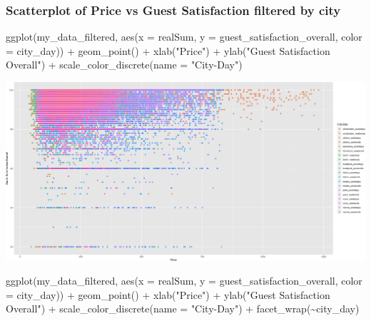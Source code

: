 \documentclass[
]{article}
\newenvironment{Shaded}{\begin{snugshade}}{\end{snugshade}}
\newcommand{\AttributeTok}[1]{\textcolor[rgb]{0.77,0.63,0.00}{#1}}
\newcommand{\FunctionTok}[1]{\textcolor[rgb]{0.00,0.00,0.00}{#1}}
\newcommand{\NormalTok}[1]{#1}
\newcommand{\SpecialCharTok}[1]{\textcolor[rgb]{0.00,0.00,0.00}{#1}}
\newcommand{\StringTok}[1]{\textcolor[rgb]{0.31,0.60,0.02}{#1}}
\begin{document}
\hypertarget{scatterplot-of-price-vs-guest-satisfaction-filtered-by-city}{%
\subsubsection{Scatterplot of Price vs Guest Satisfaction filtered by
city}\label{scatterplot-of-price-vs-guest-satisfaction-filtered-by-city}}

\begin{Shaded}
\begin{Highlighting}[]
\FunctionTok{ggplot}\NormalTok{(my\_data\_filtered, }\FunctionTok{aes}\NormalTok{(}\AttributeTok{x =}\NormalTok{ realSum, }\AttributeTok{y =}\NormalTok{ guest\_satisfaction\_overall,}
    \AttributeTok{color =}\NormalTok{ city\_day)) }\SpecialCharTok{+} \FunctionTok{geom\_point}\NormalTok{() }\SpecialCharTok{+} \FunctionTok{xlab}\NormalTok{(}\StringTok{"Price"}\NormalTok{) }\SpecialCharTok{+} \FunctionTok{ylab}\NormalTok{(}\StringTok{"Guest Satisfaction Overall"}\NormalTok{) }\SpecialCharTok{+}
    \FunctionTok{scale\_color\_discrete}\NormalTok{(}\AttributeTok{name =} \StringTok{"City{-}Day"}\NormalTok{)}
\end{Highlighting}
\end{Shaded}

\includegraphics{Project_files/figure-latex/unnamed-chunk-24-1.png}

\begin{Shaded}
\begin{Highlighting}[]
\FunctionTok{ggplot}\NormalTok{(my\_data\_filtered, }\FunctionTok{aes}\NormalTok{(}\AttributeTok{x =}\NormalTok{ realSum, }\AttributeTok{y =}\NormalTok{ guest\_satisfaction\_overall,}
    \AttributeTok{color =}\NormalTok{ city\_day)) }\SpecialCharTok{+} \FunctionTok{geom\_point}\NormalTok{() }\SpecialCharTok{+} \FunctionTok{xlab}\NormalTok{(}\StringTok{"Price"}\NormalTok{) }\SpecialCharTok{+} \FunctionTok{ylab}\NormalTok{(}\StringTok{"Guest Satisfaction Overall"}\NormalTok{) }\SpecialCharTok{+}
    \FunctionTok{scale\_color\_discrete}\NormalTok{(}\AttributeTok{name =} \StringTok{"City{-}Day"}\NormalTok{) }\SpecialCharTok{+} \FunctionTok{facet\_wrap}\NormalTok{(}\SpecialCharTok{\textasciitilde{}}\NormalTok{city\_day)}
\end{Highlighting}
\end{Shaded}
\end{document}
